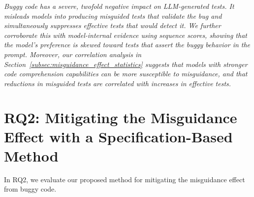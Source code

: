 \documentclass[acmsmall]{acmart}
\begin{document}
\begin{tcolorbox}[
    colback=black!5,
    colframe=black!20,
    boxrule=1pt,
    arc=2mm,
    title=RQ1 Answer,
    halign title=center,
    fonttitle=\bfseries\small,
    boxsep=1pt,
    left=3pt,
    right=3pt,
    top=3pt,
    bottom=3pt,
    toptitle=1pt,
    bottomtitle=1pt,
    lefttitle=3pt,
    righttitle=3pt,
]
\textit{Buggy code has a severe, twofold negative impact on LLM-generated tests. It misleads models into producing misguided tests that validate the bug and simultaneously suppresses effective tests that would detect it. We further corroborate this with model-internal evidence using sequence scores, showing that the model's preference is skewed toward tests that assert the buggy behavior in the prompt. Moreover, our correlation analysis in Section~\ref{subsec:misguidance_effect_statistics} suggests that models with stronger code comprehension capabilities can be more susceptible to misguidance, and that reductions in misguided tests are correlated with increases in effective tests.}
\end{tcolorbox}





\section{RQ2: Mitigating the Misguidance Effect with a Specification-Based Method}
In RQ2, we evaluate our proposed method for mitigating the misguidance effect from buggy code.
\end{document}
